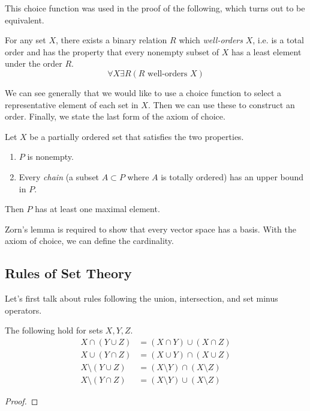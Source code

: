 \documentclass{article}
\begin{document}
    This choice function was used in the proof of the following, which turns out to be equivalent. 

    \begin{axiom}
      For any set $X$, there exists a binary relation $R$ which \textit{well-orders} $X$, i.e. is a total order and has the property that every nonempty subset of $X$ has a least element under the order $R$. 
      \begin{equation}
        \forall X \exists R (R \text{ well-orders } X)
      \end{equation}
    \end{axiom}

    We can see generally that we would like to use a choice function to select a representative element of each set in $X$. Then we can use these to construct an order. Finally, we state the last form of the axiom of choice. 

    \begin{axiom}
      Let $X$ be a partially ordered set that satisfies the two properties. 
      \begin{enumerate}
        \item $P$ is nonempty. 
        \item Every \textit{chain} (a subset $A \subset P$ where $A$ is totally ordered) has an upper bound in $P$. 
      \end{enumerate}
      Then $P$ has at least one maximal element. 
    \end{axiom}

    Zorn's lemma is required to show that every vector space has a basis. With the axiom of choice, we can define the cardinality. 

    \begin{definition}[Cardinality]
      
    \end{definition}

  \subsection{Rules of Set Theory} 

    Let's first talk about rules following the union, intersection, and set minus operators. 

    \begin{theorem}
      The following hold for sets $X, Y, Z$. 
      \begin{align}
        X \cap (Y \cup Z) & = (X \cap Y) \cup (X \cap Z) \\  
        X \cup (Y \cap Z) & = (X \cup Y) \cap (X \cup Z) \\ 
        X \setminus (Y \cup Z) & = (X \setminus Y) \cap (X \setminus Z) \\
        X \setminus (Y \cap Z) & = (X \setminus Y) \cup (X \setminus Z)
      \end{align}
    \end{theorem}
    \begin{proof}
      
    \end{proof} 
\end{document}
